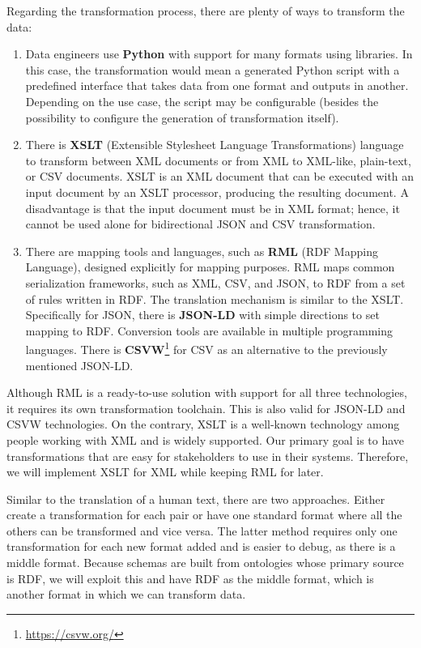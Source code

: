 Regarding the transformation process, there are plenty of ways to transform the data:
\begin{enumerate}
    \item Data engineers use \textbf{Python} with support for many formats using libraries. In this case, the transformation would mean a generated Python script with a predefined interface that takes data from one format and outputs in another. Depending on the use case, the script may be configurable (besides the possibility to configure the generation of transformation itself).
    \item There is \textbf{XSLT} (Extensible Stylesheet Language Transformations) language to transform between XML documents or from XML to XML-like, plain-text, or CSV documents. XSLT is an XML document that can be executed with an input document by an XSLT processor, producing the resulting document. A disadvantage is that the input document must be in XML format; hence, it cannot be used alone for bidirectional JSON and CSV transformation.
    \item There are mapping tools and languages, such as \textbf{RML} \cite{dimou2014rml} (RDF Mapping Language), designed explicitly for mapping purposes. RML maps common serialization frameworks, such as XML, CSV, and JSON, to RDF from a set of rules written in RDF. The translation mechanism is similar to the XSLT. Specifically for JSON, there is \textbf{JSON-LD} with simple directions to set mapping to RDF. Conversion tools are available in multiple programming languages. There is \textbf{CSVW}\footnote{\url{https://csvw.org/}} for CSV as an alternative to the previously mentioned JSON-LD.
\end{enumerate}

Although RML is a ready-to-use solution with support for all three technologies, it requires its own transformation toolchain. This is also valid for JSON-LD and CSVW technologies. On the contrary, XSLT is a well-known technology among people working with XML and is widely supported. Our primary goal is to have transformations that are easy for stakeholders to use in their systems. Therefore, we will implement XSLT for XML while keeping RML for later.

Similar to the translation of a human text, there are two approaches. Either create a transformation for each pair or have one standard format where all the others can be transformed and vice versa. The latter method requires only one transformation for each new format added and is easier to debug, as there is a middle format. Because schemas are built from ontologies whose primary source is RDF, we will exploit this and have RDF as the middle format, which is another format in which we can transform data.

